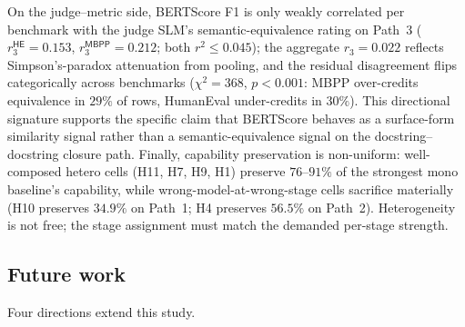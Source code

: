 On the judge--metric side, BERTScore F1 is only weakly correlated per benchmark with the judge SLM's semantic-equivalence rating on Path~3 ($r_3^{\textsf{HE}} = 0.153$, $r_3^{\textsf{MBPP}} = 0.212$; both $r^2 \leq 0.045$); the aggregate $r_3 = 0.022$ reflects Simpson's-paradox attenuation from pooling, and the residual disagreement flips categorically across benchmarks ($\chi^2 = 368$, $p < 0.001$: MBPP over-credits equivalence in $29\%$ of rows, HumanEval under-credits in $30\%$). This directional signature supports the specific claim that BERTScore behaves as a surface-form similarity signal rather than a semantic-equivalence signal on the docstring--docstring closure path. Finally, capability preservation is non-uniform: well-composed hetero cells (H11, H7, H9, H1) preserve $76$--$91\%$ of the strongest mono baseline's capability, while wrong-model-at-wrong-stage cells sacrifice materially (H10 preserves $34.9\%$ on Path~1; H4 preserves $56.5\%$ on Path~2). Heterogeneity is not free; the stage assignment must match the demanded per-stage strength.

\subsection{Future work}

Four directions extend this study.

